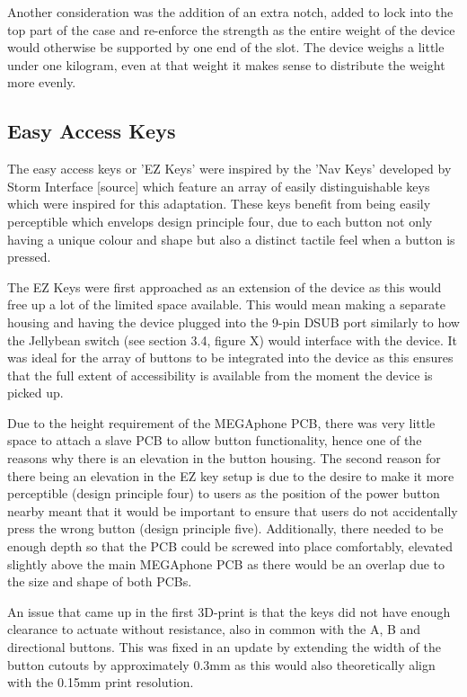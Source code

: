 Another consideration was the addition of an extra notch, added to lock into the top part of the case and re-enforce the strength as the entire weight of the device would otherwise be supported by one end of the slot. %
The device weighs a little under one kilogram, even at that weight it makes sense to distribute the weight more evenly.

\subsection{Easy Access Keys}

The easy access keys or 'EZ Keys' were inspired by the 'Nav Keys' developed by Storm Interface [source] which feature an array of easily distinguishable keys which were inspired for this adaptation.
These keys benefit from being easily perceptible which envelops design principle four, due to each button not only having a unique colour and shape but also a distinct tactile feel when a button is pressed.

The EZ Keys were first approached as an extension of the device as this would free up a lot of the limited space available.
This would mean making a separate housing and having the device plugged into the 9-pin DSUB port similarly to how the Jellybean switch (see section 3.4, figure X) would interface with the device.
It was ideal for the array of buttons to be integrated into the device as this ensures that the full extent of accessibility is available from the moment the device is picked up.

Due to the height requirement of the MEGAphone PCB, there was very little space to attach a slave PCB to allow button functionality, hence one of the reasons why there is an elevation in the button housing.
The second reason for there being an elevation in the EZ key setup is due to the desire to make it more perceptible (design principle four) to users as the position of the power button nearby meant that it would be important to ensure that users do not accidentally press the wrong button (design principle five).
Additionally, there needed to be enough depth so that the PCB could be screwed into place comfortably, elevated slightly above the main MEGAphone PCB as there would be an overlap due to the size and shape of both PCBs.

An issue that came up in the first 3D-print is that the keys did not have enough clearance to actuate without resistance, also in common with the A, B and directional buttons.
This was fixed in an update by extending the width of the button cutouts by approximately 0.3mm as this would also theoretically align with the 0.15mm print resolution. %

